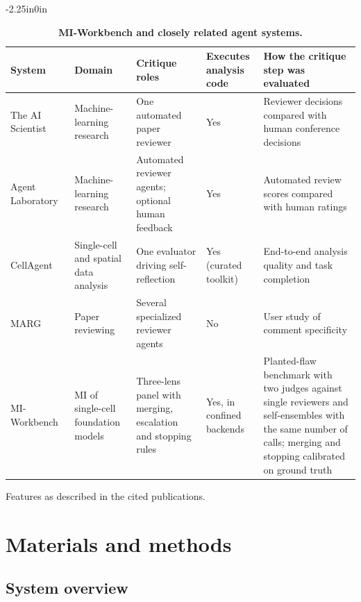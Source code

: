 \documentclass[10pt,letterpaper]{article}
\begin{document}
\begin{table}[!ht]
\begin{adjustwidth}{-2.25in}{0in}
\centering
\caption{{\bf MI-Workbench and closely related agent systems.}}
\label{table_related}
\begin{tabular}{@{}>{\raggedright\arraybackslash}p{2.7cm}>{\raggedright\arraybackslash}p{2.5cm}>{\raggedright\arraybackslash}p{3.2cm}>{\raggedright\arraybackslash}p{2.0cm}>{\raggedright\arraybackslash}p{4.6cm}@{}}
\hline
\textbf{System} & \textbf{Domain} & \textbf{Critique roles} & \textbf{Executes analysis code} & \textbf{How the critique step was evaluated} \\ \hline
The AI Scientist~\cite{lu2024aiscientist,lu2026aiscientist,yamada2025aiscientistv2} & Machine-learning research & One automated paper reviewer & Yes & Reviewer decisions compared with human conference decisions \\
Agent Laboratory~\cite{schmidgall2025agentlab} & Machine-learning research & Automated reviewer agents; optional human feedback & Yes & Automated review scores compared with human ratings \\
CellAgent~\cite{xiao2024cellagent,xiao2026cellagent} & Single-cell and spatial data analysis & One evaluator driving self-reflection & Yes (curated toolkit) & End-to-end analysis quality and task completion \\
MARG~\cite{darcy2024marg} & Paper reviewing & Several specialized reviewer agents & No & User study of comment specificity \\
MI-Workbench & MI of single-cell foundation models & Three-lens panel with merging, escalation and stopping rules & Yes, in confined backends & Planted-flaw benchmark with two judges against single reviewers and self-ensembles with the same number of calls; merging and stopping calibrated on ground truth \\ \hline
\end{tabular}
\begin{flushleft} Features as described in the cited publications.
\end{flushleft}
\end{adjustwidth}
\end{table}


\section*{Materials and methods}

\subsection*{System overview}
\end{document}
